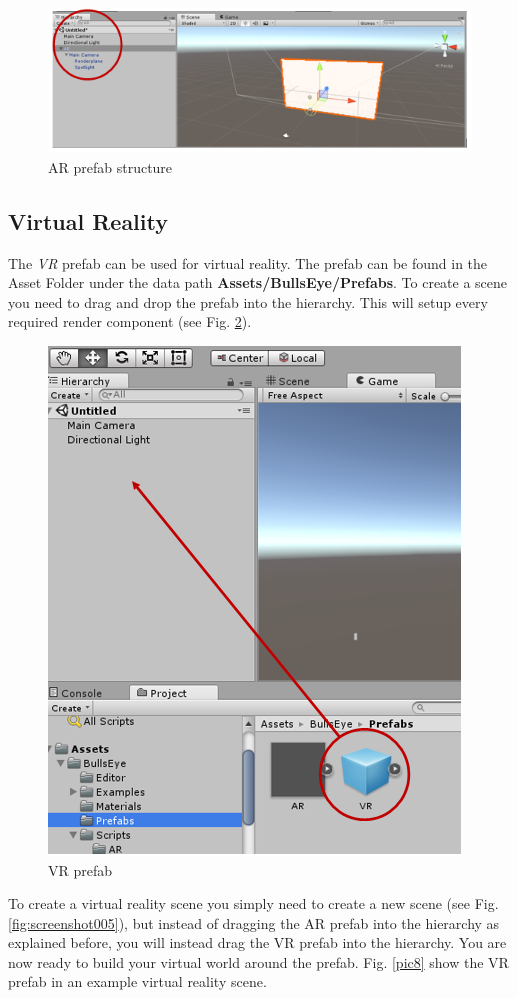 \documentclass[../../Instructions_Framework]{subfiles}
\begin{document}
\begin{figure}
	\centering
	\includegraphics[width=0.7\linewidth]{img/screenshot004}
	\caption{AR prefab structure}
	\label{fig:screenshot004}
\end{figure}

\subsection{Virtual Reality}
The \textit{VR} prefab can be used for virtual reality. The prefab can be found in the Asset Folder under the data path \textbf{Assets/BullsEye/Prefabs}. To create a scene you need to drag and drop the prefab into the hierarchy. This will setup every required render component (see Fig. \ref{fig:screenshot003}).
\begin{figure}
	\centering
	\includegraphics[width=0.7\linewidth]{img/screenshot003}
	\caption{VR prefab}
	\label{fig:screenshot003}
\end{figure}
To create a virtual reality scene you simply need to create a new scene (see Fig. \ref{fig:screenshot005}), but instead of dragging the AR prefab into the hierarchy as explained before, you will instead drag the VR prefab into the hierarchy. You are now ready to build your virtual world around the prefab. Fig. \ref{pic8} show the VR prefab in an example virtual reality scene.
\end{document}
